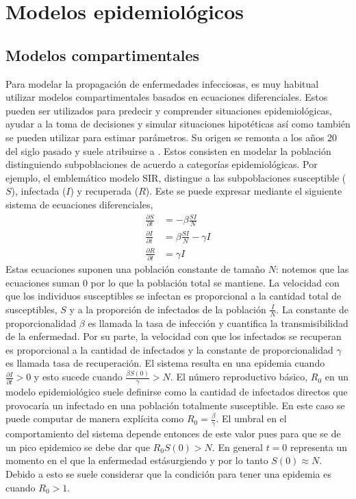 \chapter{Modelos epidemiológicos}

\section{Modelos compartimentales}

Para modelar la propagación de enfermedades infecciosas, es muy habitual utilizar modelos compartimentales basados en ecuaciones diferenciales. Estos pueden ser utilizados para predecir y comprender situaciones epidemiológicas, ayudar a la toma de decisiones y simular situaciones hipotéticas así como también se pueden utilizar para estimar parámetros. Su origen se remonta a los años 20 del siglo pasado y suele atribuirse a \cite{Kermack1927}. Estos consisten en modelar la población distinguiendo subpoblaciones de acuerdo a categorías epidemiológicas. Por ejemplo, el emblemático modelo SIR, distingue a las subpoblaciones susceptible ($S$), infectada ($I$) y recuperada ($R$). Este se puede expresar mediante el siguiente sistema de ecuaciones diferenciales,
\begin{align} \label{eq:sir}
    \frac{\partial S}{\partial t} &= -\beta \frac{SI}{N}\\
    \frac{\partial I}{\partial t} &= \beta \frac{SI}{N} - \gamma I \\
    \frac{\partial R}{\partial t} &= \gamma I
\end{align}
Estas ecuaciones suponen una población constante de tamaño $N$: notemos que las ecuaciones suman 0 por lo que la población total se mantiene. La velocidad con que los individuos susceptibles se infectan es proporcional a la cantidad total de susceptibles, $S$ y a la proporción de infectados de la población $\frac{I}{N}$. La constante de proporcionalidad $\beta$ es llamada la tasa de infección y cuantifica la transmisibilidad de la enfermedad. Por su parte, la velocidad con que los infectados se recuperan es proporcional a la cantidad de infectados y la constante de proporcionalidad $\gamma$ es llamada tasa de recuperación. El sistema resulta en una epidemia cuando $\frac{\partial I}{\partial t} > 0$ y esto sucede cuando $\frac{\beta S(0)}{\gamma} > N$. El número reproductivo básico, $R_0$ en un modelo epidemiológico suele definirse como la cantidad de infectados directos que provocaría un infectado en una población totalmente susceptible. En este caso se puede computar de manera explícita como $R_0 = \frac{\beta}{\gamma}$. El umbral en el comportamiento del sistema depende entonces de este valor pues para que se de un pico epidemico se debe dar que $R_0 S(0) > N$.  En general $t = 0$ representa un momento en el que la enfermedad estásurgiendo y por lo tanto $S(0) \approx N$. Debido a esto se suele considerar que la condición para tener una epidemia es cuando $R_0 > 1$. 

